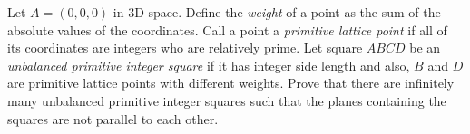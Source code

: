 Let $A = (0, 0, 0)$ in 3D space. Define the \emph{weight} of a point as the sum of the absolute values of the coordinates. Call a point a \emph{primitive lattice point} if all of its coordinates are integers who are relatively prime. Let square $ABCD$ be an \emph{unbalanced primitive integer square} if it has integer side length and also, $B$ and $D$ are primitive lattice points with different weights. Prove that there are infinitely many unbalanced primitive integer squares such that the planes containing the squares are not parallel to each other.